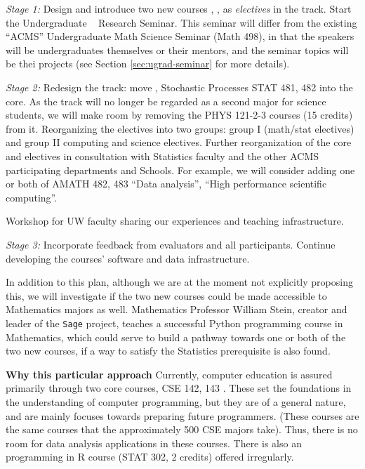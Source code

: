 {\em Stage 1:} Design and introduce two new courses \statcl, \astrocl,
as {\em electives} in the track.  Start the Undergraduate \cdse~
Research Seminar. This seminar will differ from the existing ``ACMS''
Undergraduate Math Science Seminar ({\sc Math 498}), in that the
speakers will be undergraduates themselves or their mentors, and the
seminar topics will be thei projects (see Section
\ref{sec:ugrad-seminar} for more details).

{\em Stage 2:} Redesign the track: move \statcl, Stochastic Processes {\sc STAT 481, 482} into the core. As the track will no longer be regarded as a second major for science students, we will make room by removing the {\sc PHYS 121-2-3} courses (15 credits) from it.  Reorganizing the electives into two groups: group I (math/stat electives) and group II computing and science electives. Further reorganization of the core and electives in consultation with Statistics faculty and the other ACMS participating departments and Schools. For example, we will consider adding one or both of {\sc AMATH 482, 483} ``Data analysis'', ``High performance scientific computing''.

Workshop for UW faculty sharing our experiences and teaching infrastructure.

{\em Stage 3:} Incorporate feedback from evaluators and all participants. Continue developing the courses' software and data infrastructure. 


In addition to this plan, although we are at the moment not explicitly
proposing this, we will investigate if the two new courses could be
made accessible to Mathematics majors as well. Mathematics Professor
William Stein, creator and leader of the {\tt Sage} project, teaches a
successful Python programming course in Mathematics, which could serve
to build a pathway towards one or both of the two new courses, if a
way to satisfy the Statistics prerequisite is also found.


{\bf Why this particular approach} Currently, computer education is
assured primarily through two core courses, {\sc CSE 142, 143}
\cite{cse142}. These set the foundations in the understanding of
computer programming, but they are of a general nature, and are mainly
focuses towards preparing future programmers. (These courses are the
same courses that the approximately 500 CSE majors take). Thus, there
is no room for data analysis applications in these courses.  There is
also an programming in R course ({\sc STAT 302}, 2 credits) offered
irregularly.

